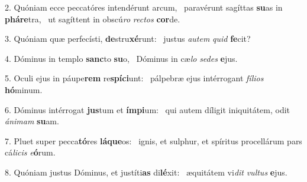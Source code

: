 2. Quóniam ecce peccatóres intendérunt arcum, \dag\  paravérunt sagíttas \textbf{su}as in \textbf{phá}\textbf{re}tra, \ast\  ut sagíttent in obscú\textit{ro} \textit{rec}\textit{tos} \textbf{cor}de.\

3. Quóniam quæ perfecísti, \textbf{de}stru\textbf{xé}runt: \ast\  justus \textit{au}\textit{tem} \textit{quid} \textbf{fe}cit?\

4. Dóminus in templo \textbf{sanc}to \textbf{su}o, \ast\  Dóminus in cæ\textit{lo} \textit{se}\textit{des} \textbf{e}jus.\

5. Oculi ejus in páupe\textbf{rem} re\textbf{spí}\textbf{ci}unt: \ast\  pálpebræ ejus intérrogant \textit{fí}\textit{li}\textit{os} \textbf{hó}minum.\

6. Dóminus intérrogat \textbf{jus}tum et \textbf{ím}\textbf{pi}um: \ast\  qui autem díligit iniquitátem, odit \textit{á}\textit{ni}\textit{mam} \textbf{su}am.\

7. Pluet super pecca\textbf{tó}res \textbf{lá}\textbf{que}os: \ast\  ignis, et sulphur, et spíritus procellárum pars cá\textit{li}\textit{cis} \textit{e}\textbf{ó}rum.\

8. Quóniam justus Dóminus, et justíti\textbf{as} di\textbf{lé}xit: \ast\  æquitátem vi\textit{dit} \textit{vul}\textit{tus} \textbf{e}jus.\

